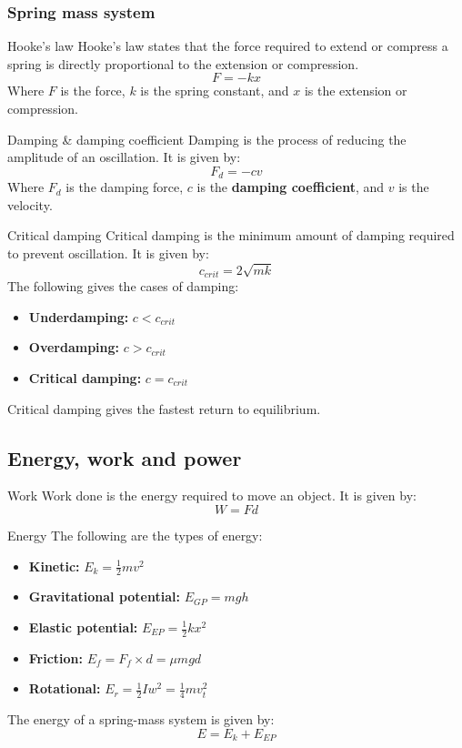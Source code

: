 \documentclass{article}
\begin{document}
\subsubsection{Spring mass system}

\begin{definition}
    {Hooke's law}
    Hooke's law states that the force required to extend or compress a spring is directly proportional to the extension or compression.
    \[F=-kx\]
    Where $F$ is the force, $k$ is the spring constant, and $x$ is the extension or compression.
\end{definition}

\begin{definition}
    {Damping \& damping coefficient}
    Damping is the process of reducing the amplitude of an oscillation. It is given by:
    \[F_d=-cv\]
    Where $F_d$ is the damping force, $c$ is the \textbf{damping coefficient}, and $v$ is the velocity.
\end{definition}

\begin{theorem}
    {Critical damping}
    Critical damping is the minimum amount of damping required to prevent oscillation. It is given by:
    \[c_{crit}=2\sqrt{mk}\]
    The following gives the cases of damping:
    \begin{itemize}
        \item \textbf{Underdamping: }$c<c_{crit}$
        \item \textbf{Overdamping: }$c>c_{crit}$
        \item \textbf{Critical damping: }$c=c_{crit}$
    \end{itemize}
    Critical damping gives the fastest return to equilibrium.
\end{theorem}

\subsection{Energy, work and power}

\begin{definition}
    {Work}
    Work done is the energy required to move an object. It is given by:
    \[W=Fd\]
\end{definition}

\begin{theorem}
    {Energy}
    The following are the types of energy:
    \begin{itemize}
        \item \textbf{Kinetic: }$E_k=\frac{1}{2}mv^2$
        \item \textbf{Gravitational potential: }$E_{GP}=mgh$
        \item \textbf{Elastic potential: }$E_{EP}=\frac{1}{2}kx^2$
        \item \textbf{Friction: } $E_{f}=F_f\times d=\mu mgd$
        \item \textbf{Rotational: } $E_{r}=\frac{1}{2}Iw^2=\frac14mv_t^2$
    \end{itemize}
    The energy of a spring-mass system is given by:
    \[E=E_k+E_{EP}\]
\end{theorem}
\end{document}
